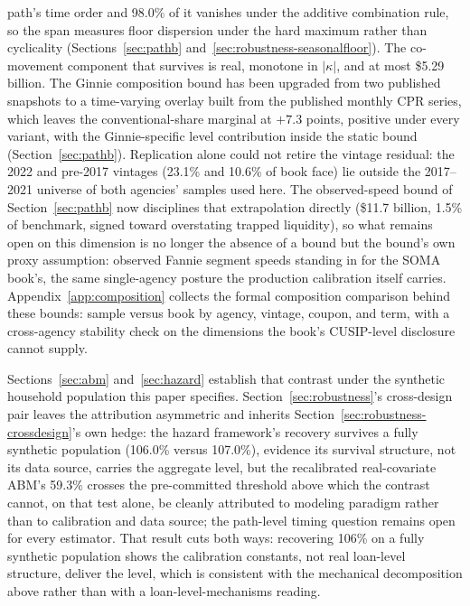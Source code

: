 \documentclass[12pt]{article}
\begin{document}
path's time order and 98.0\% of it vanishes under the additive combination rule, so the span measures floor dispersion under the hard maximum rather than cyclicality (Sections~\ref{sec:pathb} and~\ref{sec:robustness-seasonalfloor}). The co-movement component that survives is real, monotone in $|\kappa|$, and at most \$5.29 billion. The Ginnie composition bound has been upgraded from two published snapshots to a time-varying overlay built from the published monthly CPR series, which leaves the conventional-share marginal at $+7.3$ points, positive under every variant, with the Ginnie-specific level contribution inside the static bound (Section~\ref{sec:pathb}). Replication alone could not retire the vintage residual: the 2022 and pre-2017 vintages (23.1\% and 10.6\% of book face) lie outside the 2017--2021 universe of both agencies' samples used here. The observed-speed bound of Section~\ref{sec:pathb} now disciplines that extrapolation directly (\$11.7 billion, 1.5\% of benchmark, signed toward overstating trapped liquidity), so what remains open on this dimension is no longer the absence of a bound but the bound's own proxy assumption: observed Fannie segment speeds standing in for the SOMA book's, the same single-agency posture the production calibration itself carries. Appendix~\ref{app:composition} collects the formal composition comparison behind these bounds: sample versus book by agency, vintage, coupon, and term, with a cross-agency stability check on the dimensions the book's CUSIP-level disclosure cannot supply.

Sections~\ref{sec:abm} and~\ref{sec:hazard} establish that contrast under the synthetic household population this paper specifies. Section~\ref{sec:robustness}'s cross-design pair leaves the attribution asymmetric and inherits Section~\ref{sec:robustness-crossdesign}'s own hedge: the hazard framework's recovery survives a fully synthetic population (106.0\% versus 107.0\%), evidence its survival structure, not its data source, carries the aggregate level, but the recalibrated real-covariate ABM's 59.3\% crosses the pre-committed threshold above which the contrast cannot, on that test alone, be cleanly attributed to modeling paradigm rather than to calibration and data source; the path-level timing question remains open for every estimator. That result cuts both ways: recovering 106\% on a fully synthetic population shows the calibration constants, not real loan-level structure, deliver the level, which is consistent with the mechanical decomposition above rather than with a loan-level-mechanisms reading.
\end{document}
